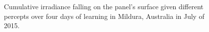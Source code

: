 \documentclass{article}
\begin{document}
{\begin{figure}[t]
\begin{center}
\caption{Cumulative irradiance falling on the panel's surface given different percepts over four days of learning in Mildura, Australia in July of 2015.}
\label{fig:results_aus}
\end{center}
\end{figure}

\begin{figure}
\begin{center}
	 \hspace{1mm} %
	 \hspace{1mm} %

\end{center}
\end{figure}}
\end{document}
